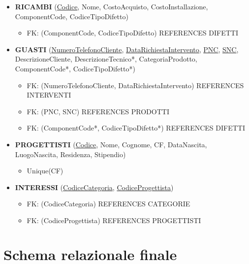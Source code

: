 \documentclass[a4paper, 12pt]{report}
\begin{document}
\begin{itemize}
	\item \textbf{RICAMBI} (\underline{Codice}, Nome, CostoAcquisto, CostoInstallazione, ComponentCode, CodiceTipoDifetto)
		\begin{itemize}[leftmargin=*, topsep=0pt]
			\item[] FK: (ComponentCode, CodiceTipoDifetto) REFERENCES DIFETTI
		\end{itemize}
	\newpage	
	\item \textbf{GUASTI} (\underline{NumeroTelefonoCliente}, \underline{DataRichiestaIntervento}, \underline{PNC}, \underline{SNC}, DescrizioneCliente, DescrizioneTecnico*, CategoriaProdotto, ComponentCode*,
	CodiceTipoDifetto*)
		\begin{itemize}[leftmargin=*, topsep=0pt]
			\item[] FK: (NumeroTelefonoCliente, DataRichiestaIntervento) REFERENCES INTERVENTI
			\item[] FK: (PNC, SNC) REFERENCES PRODOTTI
			\item[] FK: (ComponentCode*, CodiceTipoDifetto*) REFERENCES DIFETTI
		\end{itemize}
	\item \textbf{PROGETTISTI} (\underline{Codice}, Nome, Cognome, CF, DataNascita, LuogoNascita, Residenza, Stipendio)
		\begin{itemize}[leftmargin=*, topsep=0pt]
			\item[] Unique(CF)
		\end{itemize}
	\item \textbf{INTERESSI} (\underline{CodiceCategoria}, \underline{CodiceProgettista})
		\begin{itemize}[leftmargin=*, topsep=0pt]
			\item[] FK: (CodiceCategoria) REFERENCES CATEGORIE
			\item[] FK: (CodiceProgettista) REFERENCES PROGETTISTI
		\end{itemize}
\end{itemize}

\section{Schema relazionale finale}
\end{document}
